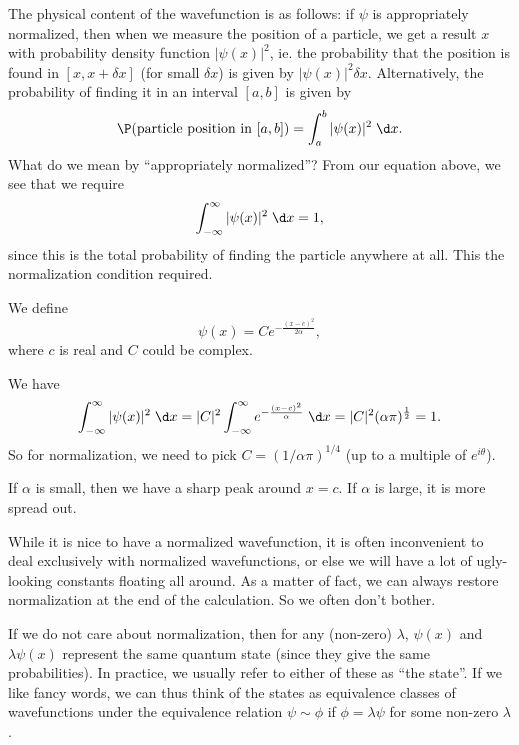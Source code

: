 \documentclass[a4paper]{article}
\begin{document}
The physical content of the wavefunction is as follows: if $\psi$ is appropriately normalized, then when we measure the position of a particle, we get a result $x$ with probability density function $|\psi(x)|^2$, ie. the probability that the position is found in $[x, x + \delta x]$ (for small $\delta x$) is given by $|\psi(x)|^2 \delta x$. Alternatively, the probability of finding it in an interval $[a, b]$ is given by
\[
  \P(\text{particle position in }[a, b]) = \int_a^b |\psi(x)|^2 \;\d x.
\]
What do we mean by ``appropriately normalized''? From our equation above, we see that we require
\[
  \int_{-\infty}^\infty |\psi(x)|^2\;\d x = 1,
\]
since this is the total probability of finding the particle anywhere at all. This the normalization condition required.

\begin{eg}
  We define
  \[
    \psi(x) = C e^{-\frac{(x - c)^2}{2\alpha}},
  \]
  where $c$ is real and $C$ could be complex.
  \begin{center}
  \end{center}
  We have
  \[
    \int_{-\infty}^\infty |\psi(x)|^2 \;\d x = |C|^2 \int_{-\infty}^{\infty}e^{-\frac{(x - c)^2}{\alpha}} \;\d x = |C|^2 (\alpha \pi)^{\frac{1}{2}} = 1.
  \]
  So for normalization, we need to pick $C = (1/\alpha \pi)^{1/4}$ (up to a multiple of $e^{i\theta}$).

  If $\alpha$ is small, then we have a sharp peak around $x = c$. If $\alpha$ is large, it is more spread out.
\end{eg}
While it is nice to have a normalized wavefunction, it is often inconvenient to deal exclusively with normalized wavefunctions, or else we will have a lot of ugly-looking constants floating all around. As a matter of fact, we can always restore normalization at the end of the calculation. So we often don't bother.

If we do not care about normalization, then for any (non-zero) $\lambda$, $\psi(x)$ and $\lambda \psi(x)$ represent the same quantum state (since they give the same probabilities). In practice, we usually refer to either of these as ``the state''. If we like fancy words, we can thus think of the states as equivalence classes of wavefunctions under the equivalence relation $\psi \sim \phi$ if $\phi = \lambda \psi$ for some non-zero $\lambda$.
\end{document}
